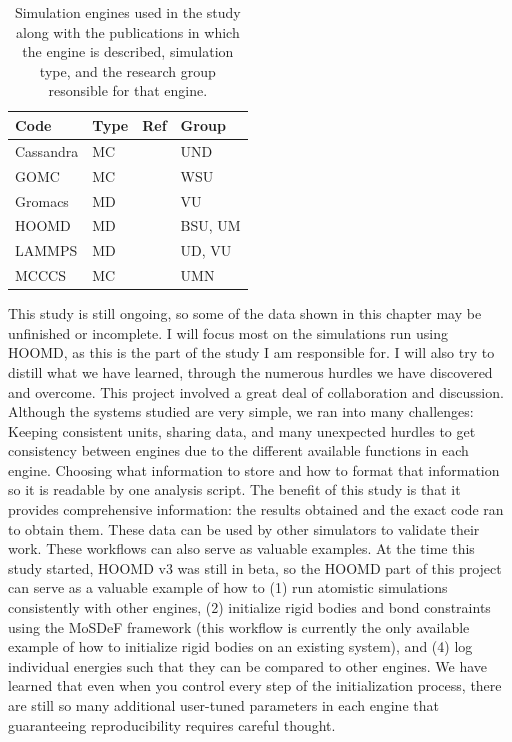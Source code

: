 \begin{table}
\caption{Simulation engines used in the study along with the publications in which the engine is described, simulation type, and the research group resonsible for that engine.}\label{tab:engines}
\centering
\begin{tabular}{llll}
Code      & Type & Ref             & Group   \\ \hline
Cassandra & MC   & \cite{Shah2017} & UND     \\
GOMC      & MC   & \cite{Shah2017} & WSU     \\
Gromacs   & MD   & \cite{ABRAHAM201519, Pall2015, 10.1093/bioinformatics/btt055, Lindahl2001, BERENDSEN199543, https://doi.org/10.1002/jcc.20291, Hess2008} & VU      \\
HOOMD     & MD   & \cite{Anderson2020, Nguyen2011a, Glaser2020a, Lebard2012} & BSU, UM \\
LAMMPS    & MD   & \cite{LAMMPS} & UD, VU  \\
MCCCS     & MC   & \cite{C8SC05340E,Josephson2019} & UMN    
\end{tabular}
\end{table}

This study is still ongoing, so some of the data shown in this chapter may be unfinished or incomplete. 
I will focus most on the simulations run using HOOMD, as this is the part of the study I am responsible for.
I will also try to distill what we have learned, through the numerous hurdles we have discovered and overcome. 
This project involved a great deal of collaboration and discussion.
Although the systems studied are very simple, we ran into many challenges:
Keeping consistent units, sharing data, and many unexpected hurdles to get consistency between engines due to the different available functions in each engine. %
Choosing what information to store and how to format that information so it is readable by one analysis script. 
The benefit of this study is that it provides comprehensive information: the results obtained and the exact code ran to obtain them. 
These data can be used by other simulators to validate their work.
These workflows can also serve as valuable examples. 
At the time this study started, HOOMD v3 was still in beta, so the HOOMD part of this project can serve as a valuable example of how to (1) run atomistic simulations consistently with other engines, (2) initialize rigid bodies and bond constraints using the MoSDeF framework (this workflow is currently the only available example of how to initialize rigid bodies on an existing system), and (4) log individual energies such that they can be compared to other engines. 
We have learned that even when you control every step of the initialization process, there are still so many additional user-tuned parameters in each engine that guaranteeing reproducibility requires careful thought.

